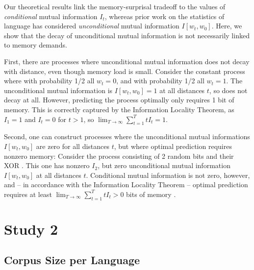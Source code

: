 \documentclass[11pt,letterpaper]{article}
\begin{document}
Our theoretical results link the memory-surprisal tradeoff to the values of \emph{conditional} mutual information $I_t$, whereas prior work on the statistics of language has considered \emph{unconditional} mutual information $I[w_t, w_0]$.
Here, we show that the decay of unconditional mutual information is not necessarily linked to memory demands.

First, there are processes where unconditional mutual information does not decay with distance, even though memory load is small.
Consider the constant process where with probability 1/2 all $w_t = 0$, and with probability 1/2 all $w_t = 1$.
The unconditional mutual information is $I[w_t, w_0] = 1$ at all distances $t$, so does not decay at all.
However, predicting the process optimally only requires 1 bit of memory.
This is correctly captured by the Information Locality Theorem, as $I_1 = 1$ and $I_t = 0$ for $t>1$, so $\lim_{T\rightarrow\infty} \sum_{t=1}^T tI_t = 1$.

Second, one can construct processes where the unconditional mutual informations $I[w_t, w_0]$ are zero for all distances $t$, but where optimal prediction requires nonzero memory:
Consider the process consisting of 2 random bits and their XOR \citep[called RRXOR by][]{crutchfield2003regularities}. This one has nonzero $I_2$, but zero unconditional mutual information $I[w_t, w_0]$ at all distances $t$.
Conditional mutual information is not zero, however, and -- in accordance with the Information Locality Theorem -- optimal prediction requires at least $\lim_{T\rightarrow\infty} \sum_{t=1}^T tI_t > 0$ bits of memory \citep{crutchfield2003regularities}.




\section{Study 2}

\subsection{Corpus Size per Language}
\end{document}
